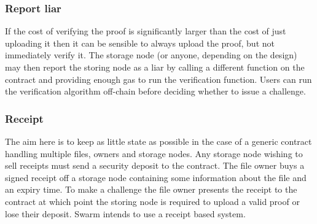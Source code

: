 \documentclass[12pt,a4paper,twoside,openright]{report}
\begin{document}
\begin{appendices}
\subsubsection{Report liar}

If the cost of verifying the proof is significantly larger than the cost of just uploading it then
it can be sensible to always upload the proof, but not immediately verify it.
The storage node (or anyone, depending on the design) may then report the storing node as a liar by calling a different function on the contract
and providing enough gas to run the verification function.
Users can run the verification algorithm off-chain before deciding whether to issue a challenge.

\subsubsection{Receipt}

The aim here is to keep as little state as possible in the case of a generic contract handling multiple files, owners and storage nodes.
Any storage node wishing to sell receipts must send a security deposit to the contract.
The file owner buys a signed receipt off a storage node containing some information about the file and an expiry time.
To make a challenge the file owner presents the receipt to the contract at which point the storing node is required to upload a valid proof
or lose their deposit. Swarm intends to use a receipt based system.








\end{appendices}
\end{document}
